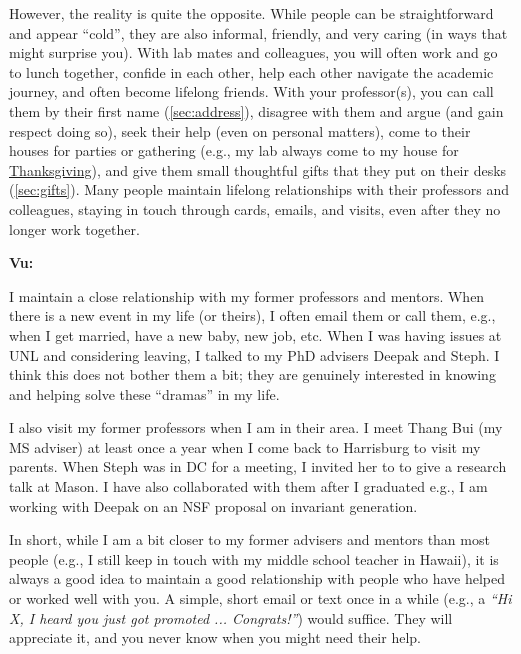 \documentclass[oneside,11pt,dvipsnames]{book}
\newenvironment{commentbox}[1][]{
  \small
  \begin{mybox}
    {\small \textbf{#1}}
  }{
  \end{mybox}
}
\begin{document}
However, the reality is quite the opposite. While people can be straightforward and appear ``cold'', they are also informal, friendly, and very caring (in ways that might surprise you).
With lab mates and colleagues, you will often work and go to lunch together, confide in each other, help each other navigate the academic journey, and often become lifelong friends.
With your professor(s), you can call them by their first name (\autoref{sec:address}), disagree with them and argue (and gain respect doing so), seek their help (even on personal matters), come to their houses for parties or gathering (e.g., my lab always come to my house for \href{https://photos.app.goo.gl/LFtbqQUuznq9eiL7A}{Thanksgiving}), and give them small thoughtful gifts that they put on their desks (\autoref{sec:gifts}).  
Many people maintain lifelong relationships with their professors and colleagues, staying in touch through cards, emails, and visits, even after they no longer work together.

\begin{commentbox}[Vu:]
    I maintain a close relationship with my former professors and mentors. When there is a new event in my life (or theirs), I often email them or call them, e.g., when I get married, have a new baby, new job, etc. When I was having issues at UNL and considering leaving, I talked to my PhD advisers Deepak and Steph. I think this does not bother them a bit; they are genuinely interested in knowing and helping solve these ``dramas'' in my life.
        
    I also visit my former professors when I am in their area. I meet Thang Bui (my MS adviser) at least once a year when I come back to Harrisburg to visit my parents. When Steph was in DC for a meeting, I invited her to to give a research talk at Mason. I have also collaborated with them after I graduated e.g., I am working with Deepak on an NSF proposal on invariant generation. 
    
    In short, while I am a bit closer to my former advisers and mentors than most people (e.g., I still keep in touch with my middle school teacher in Hawaii), it is always a good idea to maintain a good relationship with people who have helped or worked well with you. A simple, short email or text once in a while (e.g., a \emph{``Hi X, I heard you just got promoted ... Congrats!''}) would suffice. They will appreciate it, and you never know when you might need their help.
    
        
  \end{commentbox}
  
\end{document}
